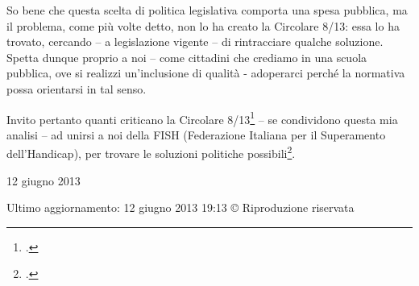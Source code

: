 So bene che questa scelta di politica legislativa comporta una spesa pubblica, ma il problema, come più volte detto, non lo ha creato la Circolare 8/13: essa lo ha trovato, cercando – a legislazione vigente – di rintracciare qualche soluzione. Spetta dunque proprio a noi – come cittadini che crediamo in una scuola pubblica, ove si realizzi un'inclusione di qualità - adoperarci perché la normativa possa orientarsi in tal senso.

Invito pertanto quanti criticano la Circolare 8/13\footcite{cm8_2013} – se condividono questa mia analisi – ad unirsi a noi della FISH (Federazione Italiana per il Superamento dell'Handicap), per trovare le soluzioni politiche possibili\footcite{nocera1}.


12 giugno 2013

Ultimo aggiornamento: 12 giugno 2013 19:13
© Riproduzione riservata
